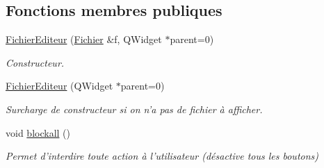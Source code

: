 \subsection*{Fonctions membres publiques}
\begin{DoxyCompactItemize}
\item 
\hyperlink{class_fichier_editeur_a21dd5dd8fdb8564a3015956226339102}{Fichier\-Editeur} (\hyperlink{class_fichier}{Fichier} \&f, Q\-Widget $\ast$parent=0)
\begin{DoxyCompactList}\small\item\em Constructeur. \end{DoxyCompactList}\item 
\hypertarget{class_fichier_editeur_aee157b3bd8cea8a662a9c4a9c6a8d321}{\hyperlink{class_fichier_editeur_aee157b3bd8cea8a662a9c4a9c6a8d321}{Fichier\-Editeur} (Q\-Widget $\ast$parent=0)}\label{class_fichier_editeur_aee157b3bd8cea8a662a9c4a9c6a8d321}

\begin{DoxyCompactList}\small\item\em Surcharge de constructeur si on n'a pas de fichier à afficher. \end{DoxyCompactList}\item 
\hypertarget{class_fichier_editeur_a510e47495af4999ccbe2a40f05ff0db7}{void \hyperlink{class_fichier_editeur_a510e47495af4999ccbe2a40f05ff0db7}{blockall} ()}\label{class_fichier_editeur_a510e47495af4999ccbe2a40f05ff0db7}

\begin{DoxyCompactList}\small\item\em Permet d'interdire toute action à l'utilisateur (désactive tous les boutons) \end{DoxyCompactList}\end{DoxyCompactItemize}
